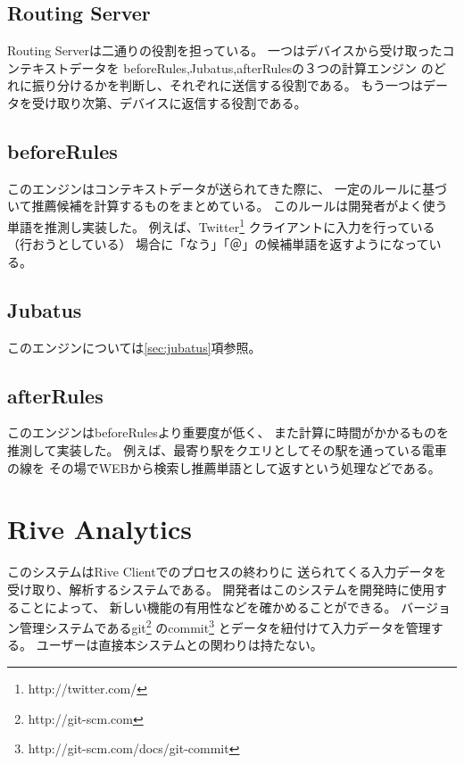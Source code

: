 \subsection{Routing Server}
Routing Serverは二通りの役割を担っている。
一つはデバイスから受け取ったコンテキストデータを
beforeRules,Jubatus,afterRulesの３つの計算エンジン
のどれに振り分けるかを判断し、それぞれに送信する役割である。
もう一つはデータを受け取り次第、デバイスに返信する役割である。

\subsection{beforeRules}
\label{sec:beforerules}
このエンジンはコンテキストデータが送られてきた際に、
一定のルールに基づいて推薦候補を計算するものをまとめている。
このルールは開発者がよく使う単語を推測し実装した。
例えば、Twitter\footnote{http://twitter.com/}
クライアントに入力を行っている（行おうとしている）
場合に「なう」「＠」の候補単語を返すようになっている。

\subsection{Jubatus}
このエンジンについては\ref{sec:jubatus}項参照。

\subsection{afterRules}
\label{sec:afterrules}
このエンジンはbeforeRulesより重要度が低く、
また計算に時間がかかるものを推測して実装した。
例えば、最寄り駅をクエリとしてその駅を通っている電車の線を
その場でWEBから検索し推薦単語として返すという処理などである。

\section{Rive Analytics}
このシステムはRive Clientでのプロセスの終わりに
送られてくる入力データを受け取り、解析するシステムである。
開発者はこのシステムを開発時に使用することによって、
新しい機能の有用性などを確かめることができる。
バージョン管理システムであるgit\footnote{http://git-scm.com}
のcommit\footnote{http://git-scm.com/docs/git-commit}
とデータを紐付けて入力データを管理する。
ユーザーは直接本システムとの関わりは持たない。

